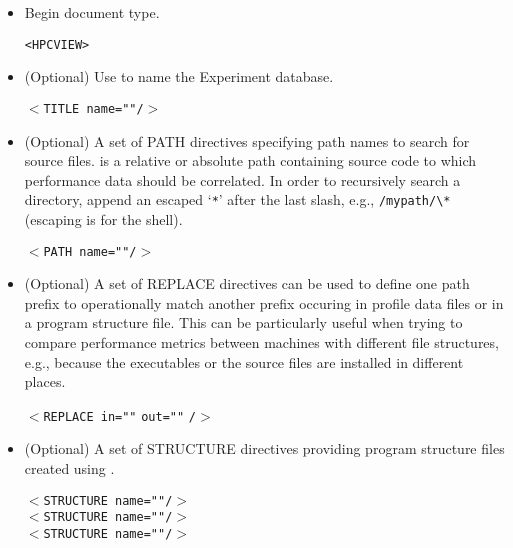 \documentclass[english]{article}
\begin{document}
\begin{itemize}

\item Begin document type.
  \begin{itemize}
  \verb+<HPCVIEW>+
  \end{itemize}

\item (Optional) Use  to name the Experiment database.
  \begin{itemize}
  \texttt{$<$TITLE name="}\texttt{"/$>$}
  \end{itemize}

\item (Optional) A set of PATH directives specifying path names to search for source files.
 is a relative or absolute path containing source code to which performance data should be correlated.
In order to recursively search a directory, append an escaped `\texttt{*}' after the last slash, e.g., \verb+/mypath/\*+ (escaping is for the shell).
  \begin{itemize}
  \texttt{$<$PATH name="}\texttt{"/$>$}
  \end{itemize}

\item (Optional) A set of REPLACE directives can be used to define one path prefix to operationally match another prefix occuring in profile data files or in a program structure file. This can be particularly useful when trying to compare performance metrics between machines with different file structures, e.g., because the executables or the source files are installed in different places.
  \begin{itemize}
  \texttt{$<$REPLACE in="}\texttt{"}
    \texttt{out="}\texttt{"}
      \texttt{/$>$}
  \end{itemize}

\item (Optional) A set of STRUCTURE directives providing program structure files created using .
  \begin{itemize}
  \texttt{$<$STRUCTURE name="}\texttt{"/$>$}\\
  \texttt{$<$STRUCTURE name="}\texttt{"/$>$}\\
  \texttt{$<$STRUCTURE name="}\texttt{"/$>$}\\
  \end{itemize}


\end{itemize}
\end{document}

